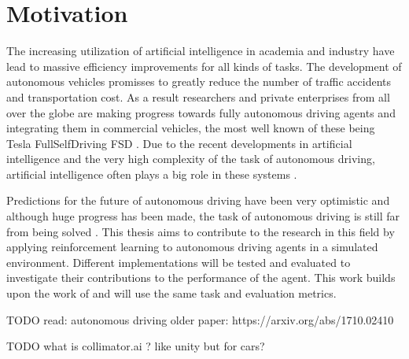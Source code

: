 \chapter{Motivation}
\label{cha:Motivation}

The increasing utilization of artificial intelligence in academia and industry have lead to massive efficiency improvements for all kinds of tasks. The development of autonomous vehicles promisses to greatly reduce the number of traffic accidents and transportation cost. As a result researchers and private enterprises from all over the globe are making progress towards fully autonomous driving agents and integrating them in commercial vehicles, the most well known of these being Tesla FullSelfDriving FSD \autocite{tesla}. Due to the recent developments in artificial intelligence and the very high complexity of the task of autonomous driving, artificial intelligence often plays a big role in these systems \autocite{teslaEndToEnd}.

Predictions for the future of autonomous driving have been very optimistic and although huge progress has been made, the task of autonomous driving is still far from being solved \autocite{state_of_autonomous_driving2023}. This thesis aims to contribute to the research in this field by applying reinforcement learning to autonomous driving agents in a simulated environment. Different implementations will be tested and evaluated to investigate their contributions to the performance of the agent. This work builds upon the work of \autocite{maximilian} and will use the same task and evaluation metrics. %



TODO read:
autonomous driving older paper:
https://arxiv.org/abs/1710.02410

TODO what is collimator.ai ? like unity but for cars?



